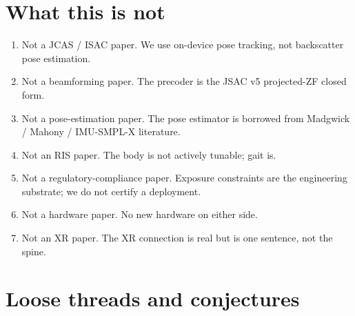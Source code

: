 \documentclass[11pt,a4paper]{article}
\theoremstyle{definition}
\begin{document}
\section{What this is not}\label{sec:notthis}

\begin{enumerate}[leftmargin=1.6em,itemsep=3pt]
\item Not a JCAS / ISAC paper.  We use on-device pose tracking, not
backscatter pose estimation.
\item Not a beamforming paper.  The precoder is the JSAC v5
projected-ZF closed form.
\item Not a pose-estimation paper.  The pose estimator is
borrowed from Madgwick / Mahony / IMU-SMPL-X literature.
\item Not an RIS paper.  The body is not actively tunable; gait is.
\item Not a regulatory-compliance paper.  Exposure constraints are
the engineering substrate; we do not certify a deployment.
\item Not a hardware paper.  No new hardware on either side.
\item Not an XR paper.  The XR connection is real but is one
sentence, not the spine.
\end{enumerate}

\section{Loose threads and conjectures}\label{sec:threads}
\end{document}

